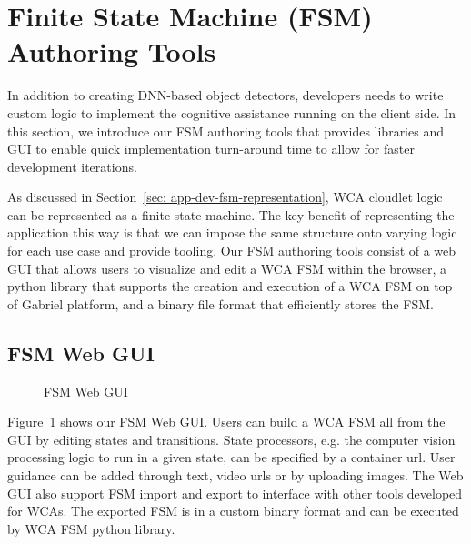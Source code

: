 \section{Finite State Machine (FSM) Authoring Tools}
\label{sec: app-dev-fsm}

In addition to creating DNN-based object detectors, developers needs to write
custom logic to implement the cognitive assistance running on the client side.
In this section, we introduce our FSM authoring tools that provides libraries
and GUI to enable quick implementation turn-around time to allow for faster
development iterations.

As discussed in Section~\ref{sec: app-dev-fsm-representation}, WCA cloudlet
logic can be represented as a finite state machine. The key benefit of
representing the application this way is that we can impose the same structure
onto varying logic for each use case and provide tooling. Our FSM authoring
tools consist of a web GUI that allows users to visualize and edit a WCA FSM
within the browser, a python library that supports the creation and execution of
a WCA FSM on top of Gabriel platform, and a binary file format that efficiently
stores the FSM.

\subsection{FSM Web GUI}

\begin{figure}
    \centering
	\caption{FSM Web GUI}
    \label{figs:fsm-web-gui}
\end{figure}

Figure~\ref{figs:fsm-web-gui} shows our FSM Web GUI. Users can build a WCA FSM
all from the GUI by editing states and transitions. State processors, e.g. the
computer vision processing logic to run in a given state, can be specified by a
container url. User guidance can be added through text, video urls or by
uploading images. The Web GUI also support FSM import and export to interface
with other tools developed for WCAs. The exported FSM is in a custom binary
format and can be executed by WCA FSM python library.


